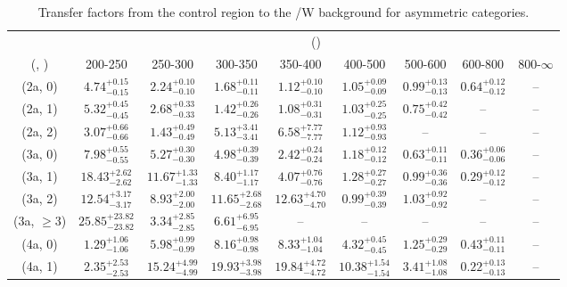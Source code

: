 \begin{table}[h!]
\tiny
\centering
\caption{Transfer factors from the \mmj control region to the \ttbar/W background for asymmetric categories.\label{tab:tf_mumu_ttw_asym}}
\begin{tabular}
{ccccccccc}
	\hline\hline
	& \multicolumn{8}{c}{\scalht (\gev)} \\ 
	 (\njet,  \nb) & 200-250 & 250-300 & 300-350 & 350-400 & 400-500 & 500-600 & 600-800 & 800-$\infty$ \\ [0.8ex] 
\hline
	(2a, 0) & $4.74^{+ 0.15 }_{- 0.15 }$ & $2.24^{+ 0.10 }_{- 0.10 }$ & $1.68^{+ 0.11 }_{- 0.11 }$ & $1.12^{+ 0.10 }_{- 0.10 }$ & $1.05^{+ 0.09 }_{- 0.09 }$ & $0.99^{+ 0.13 }_{- 0.13 }$ & $0.64^{+ 0.12 }_{- 0.12 }$ & -- \\[0.5ex] 
	(2a, 1) & $5.32^{+ 0.45 }_{- 0.45 }$ & $2.68^{+ 0.33 }_{- 0.33 }$ & $1.42^{+ 0.26 }_{- 0.26 }$ & $1.08^{+ 0.31 }_{- 0.31 }$ & $1.03^{+ 0.25 }_{- 0.25 }$ & $0.75^{+ 0.42 }_{- 0.42 }$ & -- & -- \\[0.5ex] 
	(2a, 2) & $3.07^{+ 0.66 }_{- 0.66 }$ & $1.43^{+ 0.49 }_{- 0.49 }$ & $5.13^{+ 3.41 }_{- 3.41 }$ & $6.58^{+ 7.77 }_{- 7.77 }$ & $1.12^{+ 0.93 }_{- 0.93 }$ & -- & -- & -- \\[0.5ex] 
	(3a, 0) & $7.98^{+ 0.55 }_{- 0.55 }$ & $5.27^{+ 0.30 }_{- 0.30 }$ & $4.98^{+ 0.39 }_{- 0.39 }$ & $2.42^{+ 0.24 }_{- 0.24 }$ & $1.18^{+ 0.12 }_{- 0.12 }$ & $0.63^{+ 0.11 }_{- 0.11 }$ & $0.36^{+ 0.06 }_{- 0.06 }$ & -- \\[0.5ex] 
	(3a, 1) & $18.43^{+ 2.62 }_{- 2.62 }$ & $11.67^{+ 1.33 }_{- 1.33 }$ & $8.40^{+ 1.17 }_{- 1.17 }$ & $4.07^{+ 0.76 }_{- 0.76 }$ & $1.28^{+ 0.27 }_{- 0.27 }$ & $0.99^{+ 0.36 }_{- 0.36 }$ & $0.29^{+ 0.12 }_{- 0.12 }$ & -- \\[0.5ex] 
	(3a, 2) & $12.54^{+ 3.17 }_{- 3.17 }$ & $8.93^{+ 2.00 }_{- 2.00 }$ & $11.65^{+ 2.68 }_{- 2.68 }$ & $12.63^{+ 4.70 }_{- 4.70 }$ & $0.99^{+ 0.39 }_{- 0.39 }$ & $1.03^{+ 0.92 }_{- 0.92 }$ & -- & -- \\[0.5ex] 
	(3a, $\ge3$) & $25.85^{+ 23.82 }_{- 23.82 }$ & $3.34^{+ 2.85 }_{- 2.85 }$ & $6.61^{+ 6.95 }_{- 6.95 }$ & -- & -- & -- & -- & -- \\[0.5ex] 
	(4a, 0) & $1.29^{+ 1.06 }_{- 1.06 }$ & $5.98^{+ 0.99 }_{- 0.99 }$ & $8.16^{+ 0.98 }_{- 0.98 }$ & $8.33^{+ 1.04 }_{- 1.04 }$ & $4.32^{+ 0.45 }_{- 0.45 }$ & $1.25^{+ 0.29 }_{- 0.29 }$ & $0.43^{+ 0.11 }_{- 0.11 }$ & -- \\[0.5ex] 
	(4a, 1) & $2.35^{+ 2.53 }_{- 2.53 }$ & $15.24^{+ 4.99 }_{- 4.99 }$ & $19.93^{+ 3.98 }_{- 3.98 }$ & $19.84^{+ 4.72 }_{- 4.72 }$ & $10.38^{+ 1.54 }_{- 1.54 }$ & $3.41^{+ 1.08 }_{- 1.08 }$ & $0.22^{+ 0.13 }_{- 0.13 }$ & -- \\[0.5ex] 

\end{tabular}
\end{table}
